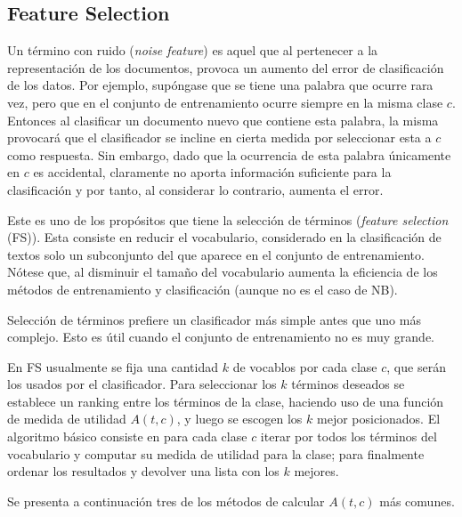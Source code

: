 \documentclass{llncs}
\begin{document}
	\newpage
	\subsection{Feature Selection}
		Un t\'ermino con ruido (\emph{noise feature}) es aquel que al pertenecer a la representaci\'on de los documentos, provoca un aumento del error de clasificaci\'on de los datos. Por ejemplo, sup\'ongase que se tiene una palabra que ocurre rara vez, pero que en el conjunto de entrenamiento ocurre siempre en la misma clase $c$. Entonces al clasificar un documento nuevo que contiene esta palabra, la misma provocar\'a que el clasificador se incline en cierta medida por seleccionar esta a $c$ como respuesta. Sin embargo, dado que la ocurrencia de esta palabra \'unicamente en $c$ es accidental, claramente no aporta informaci\'on suficiente para la clasificaci\'on y por tanto, al considerar lo contrario, aumenta el error.
		
		Este es uno de los prop\'ositos que tiene la selecci\'on de t\'erminos (\emph{feature selection} (FS)). Esta consiste en reducir el vocabulario, considerado en la clasificaci\'on de textos solo un subconjunto del que aparece en el conjunto de entrenamiento. N\'otese que, al disminuir el tama\~no del vocabulario aumenta la eficiencia de los m\'etodos de entrenamiento y clasificaci\'on (aunque no es el caso de NB).
		
		Selecci\'on de t\'erminos prefiere un clasificador m\'as simple antes que uno m\'as complejo. Esto es \'util cuando el conjunto de entrenamiento no es muy grande.
		

		 En FS usualmente se fija una cantidad $k$ de vocablos por cada clase $c$, que ser\'an los usados por el clasificador. Para seleccionar los $k$ t\'erminos deseados se establece un ranking entre los t\'erminos de la clase, haciendo uso de una funci\'on de medida de utilidad $A(t,c)$, y luego se escogen los $k$ mejor posicionados. El algoritmo b\'asico consiste en para cada clase $c$ iterar por todos los t\'erminos del vocabulario y computar su medida de utilidad para la clase; para finalmente ordenar los resultados y devolver una lista con los $k$ mejores.
		 
		 Se presenta a continuaci\'on tres de los m\'etodos de calcular $A(t,c)$ m\'as comunes.
		
\end{document}
